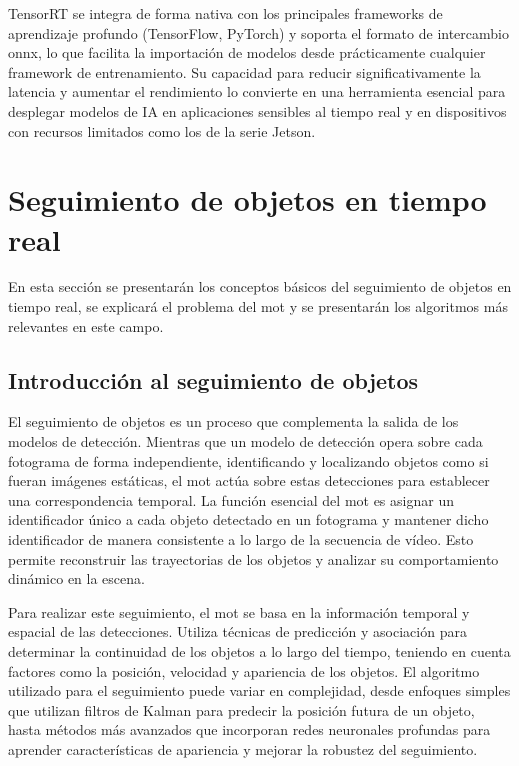 \documentclass[11pt,spanish,listoffigures,listoftables]{tfgetsinf}
\begin{document}
TensorRT se integra de forma nativa con los principales frameworks de aprendizaje profundo (TensorFlow, PyTorch) y soporta el formato de intercambio \gls{onnx}, lo que facilita la importación de modelos desde prácticamente cualquier framework de entrenamiento. Su capacidad para reducir significativamente la latencia y aumentar el rendimiento lo convierte en una herramienta esencial para desplegar modelos de IA en aplicaciones sensibles al tiempo real y en dispositivos con recursos limitados como los de la serie Jetson.



\section{Seguimiento de objetos en tiempo real} \label{sec:mot}
En esta sección se presentarán los conceptos básicos del seguimiento de objetos en tiempo real, se explicará el problema del \gls{mot} y se presentarán los algoritmos más relevantes en este campo.

\subsection{Introducción al seguimiento de objetos} \label{sec:introduccion_seguimiento_objetos}
El seguimiento de objetos es un proceso que complementa la salida de los modelos de detección. Mientras que un modelo de detección opera sobre cada fotograma de forma independiente, identificando y localizando objetos como si fueran imágenes estáticas, el \gls{mot} actúa sobre estas detecciones para establecer una correspondencia temporal. La función esencial del \gls{mot} es asignar un identificador único a cada objeto detectado en un fotograma y mantener dicho identificador de manera consistente a lo largo de la secuencia de vídeo. Esto permite reconstruir las trayectorias de los objetos y analizar su comportamiento dinámico en la escena.

Para realizar este seguimiento, el \gls{mot} se basa en la información temporal y espacial de las detecciones. Utiliza técnicas de predicción y asociación para determinar la continuidad de los objetos a lo largo del tiempo, teniendo en cuenta factores como la posición, velocidad y apariencia de los objetos. El algoritmo utilizado para el seguimiento puede variar en complejidad, desde enfoques simples que utilizan filtros de Kalman para predecir la posición futura de un objeto, hasta métodos más avanzados que incorporan redes neuronales profundas para aprender características de apariencia y mejorar la robustez del seguimiento.
\end{document}

